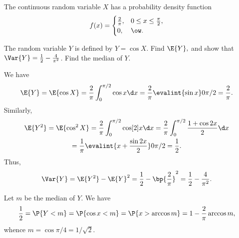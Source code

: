 \begin{problem}
    The continuous random variable $X$ has a probability density function \[f(x) = \begin{cases}
        \frac2\pi, & 0 \leq x \leq \frac\pi2,\\
        0, & \ow.
    \end{cases}\]
    
    The random variable $Y$ is defined by $Y=\cos X.$ Find $\E{Y},$ and show that $\Var{Y} = \frac12 - \frac4{\pi^2}$. Find the median of $Y$.
\end{problem}
\begin{solution}
    We have \[\E{Y} = \E{\cos X} = \frac2\pi \int_0^{\pi/2} \cos{x} \d x = \frac2\pi \evalint{\sin x}0{\pi/2} = \frac2\pi.\] Similarly,
    \begin{gather*}
        \E{Y^2} = \E{\cos^2 X} = \frac2\pi \int_0^{\pi/2} \cos[2]{x} \d x = \frac2\pi \int_0^{\pi/2} \frac{1 + \cos{2x}}{2} \d x\\
        = \frac1\pi \evalint{x + \frac{\sin 2x}2}0{\pi/2} = \frac12.
    \end{gather*}
    Thus, \[\Var{Y} = \E{Y^2} - \E{Y}^2 = \frac12 - \bp{\frac2\pi}^2 = \frac12 - \frac4{\pi^2}.\]

    Let $m$ be the median of $Y$. We have \[\frac12 = \P{Y < m} = \P{\cos x < m} = \P{x > \arccos m} = 1 - \frac2\pi \arccos m,\] whence $m = \cos{\pi/4} = 1/\sqrt2$.
\end{solution}

